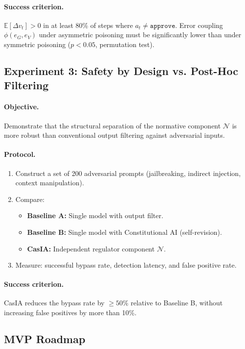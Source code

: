 \documentclass[11pt,a4paper]{article}
\theoremstyle{remark}
\newcommand{\E}{\mathbb{E}}
\begin{document}
\paragraph{Success criterion.} $\E[\Delta v_t] > 0$ in at least 80\% of steps where $a_t \neq \texttt{approve}$. Error coupling $\phi(e_G, e_V)$ under asymmetric poisoning must be significantly lower than under symmetric poisoning ($p < 0.05$, permutation test).

\subsection{Experiment 3: Safety by Design vs. Post-Hoc Filtering}

\paragraph{Objective.} Demonstrate that the structural separation of the normative component $\mathcal{N}$ is more robust than conventional output filtering against adversarial inputs.

\paragraph{Protocol.}
\begin{enumerate}
  \item Construct a set of 200 adversarial prompts (jailbreaking, indirect injection, context manipulation).
  \item Compare:
  \begin{itemize}
    \item \textbf{Baseline A:} Single model with output filter.
    \item \textbf{Baseline B:} Single model with Constitutional AI (self-revision).
    \item \textbf{CasIA:} Independent regulator component $\mathcal{N}$.
  \end{itemize}
  \item Measure: successful bypass rate, detection latency, and false positive rate.
\end{enumerate}

\paragraph{Success criterion.} CasIA reduces the bypass rate by $\geq 50\%$ relative to Baseline B, without increasing false positives by more than 10\%.

\subsection{MVP Roadmap}
\end{document}

